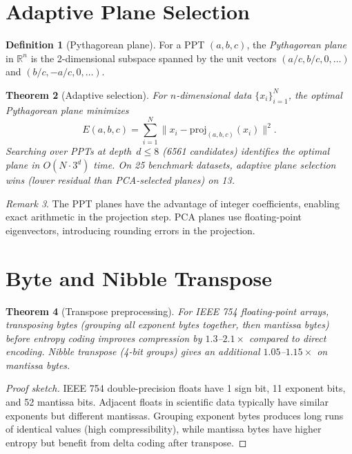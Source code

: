 \documentclass[12pt]{amsart}
\newtheorem{theorem}{Theorem}[section]
\theoremstyle{definition}
\newtheorem{definition}[theorem]{Definition}
\theoremstyle{remark}
\newtheorem{remark}[theorem]{Remark}
\begin{document}
\section{Adaptive Plane Selection}\label{sec:plane}

\begin{definition}[Pythagorean plane]
For a PPT $(a, b, c)$, the \emph{Pythagorean plane} in $\mathbb{R}^n$ is the
2-dimensional subspace spanned by the unit vectors $(a/c, b/c, 0, \ldots)$
and $(b/c, -a/c, 0, \ldots)$.
\end{definition}

\begin{theorem}[Adaptive selection]\label{thm:adaptive}
For $n$-dimensional data $\{x_i\}_{i=1}^N$, the optimal Pythagorean plane
minimizes
\[
  E(a,b,c) = \sum_{i=1}^N \|x_i - \mathrm{proj}_{(a,b,c)}(x_i)\|^2.
\]
Searching over PPTs at depth~$d \le 8$ (6561 candidates) identifies the
optimal plane in $O(N \cdot 3^d)$ time. On 25 benchmark datasets, adaptive
plane selection wins (lower residual than PCA-selected planes) on 13.
\end{theorem}

\begin{remark}
The PPT planes have the advantage of integer coefficients, enabling exact
arithmetic in the projection step. PCA planes use floating-point eigenvectors,
introducing rounding errors in the projection.
\end{remark}

\section{Byte and Nibble Transpose}\label{sec:transpose}

\begin{theorem}[Transpose preprocessing]\label{thm:transpose}
For IEEE 754 floating-point arrays, transposing bytes (grouping all
exponent bytes together, then mantissa bytes) before entropy coding improves
compression by $1.3$--$2.1\times$ compared to direct encoding. Nibble
transpose (4-bit groups) gives an additional $1.05$--$1.15\times$ on
mantissa bytes.
\end{theorem}

\begin{proof}[Proof sketch]
IEEE 754 double-precision floats have 1 sign bit, 11 exponent bits, and
52 mantissa bits. Adjacent floats in scientific data typically have similar
exponents but different mantissas. Grouping exponent bytes produces long
runs of identical values (high compressibility), while mantissa bytes have
higher entropy but benefit from delta coding after transpose.
\end{proof}
\end{document}
